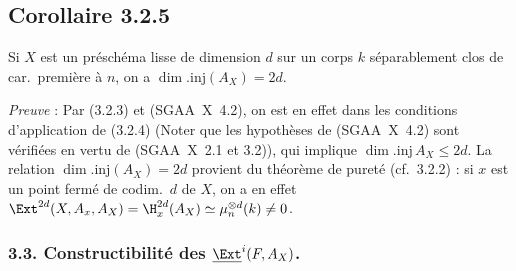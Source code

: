 \subsection*{Corollaire 3.2.5}
Si $X$ est un préschéma lisse de dimension $d$ sur un corps $k$ séparablement clos de car.~première à $n$, on a $\dim.\mathrm{inj}(A_X) = 2d$.

\emph{Preuve} : Par (3.2.3) et (SGAA~X~4.2), on est en effet dans les conditions d'application de (3.2.4) (Noter que les hypothèses de (SGAA~X~4.2) sont vérifiées en vertu de (SGAA~X~2.1 et 3.2)), qui implique $\dim.\mathrm{inj}\, A_X \leqslant 2d$. La relation $\dim.\mathrm{inj}(A_X) = 2d$ provient du théorème de pureté (cf.~3.2.2) : si $x$ est un point fermé de codim.~$d$ de $X$, on a en effet $\Ext^{2d}(X, A_x, A_X) = \H^{2d}_x(A_X) \simeq \mu_n^{\otimes d}(k) \neq 0$.

\subsubsection*{3.3. Constructibilité des \texorpdfstring{$\underline{\Ext}^i(F, A_X)$}{Ext i(F, A\_X)}.}

